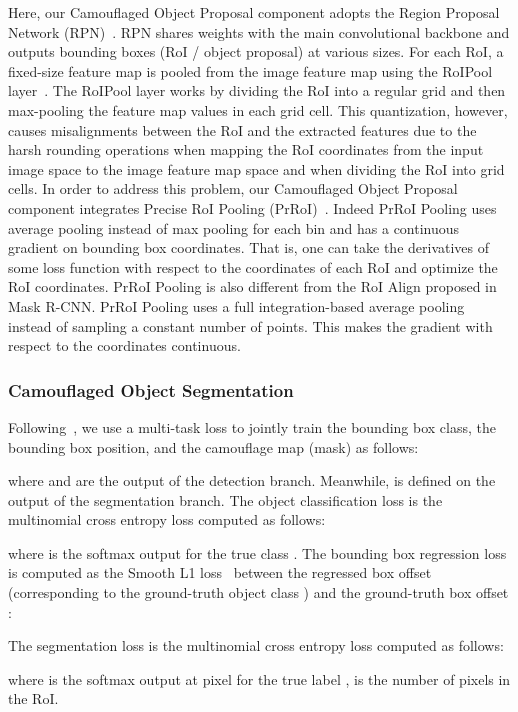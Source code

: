 \documentclass[journal]{IEEEtran}
\begin{document}
Here, our Camouflaged Object Proposal component adopts the Region Proposal Network (RPN)~\cite{Ren-NIPS2015}. RPN shares weights with the main convolutional backbone and outputs bounding boxes (RoI / object proposal) at various sizes. For each RoI, a fixed-size feature map is pooled from the image feature map using the RoIPool layer~\cite{Ren-NIPS2015}. The RoIPool layer works by dividing the RoI into a regular grid and then max-pooling the feature map values in each grid cell. This quantization, however, causes misalignments between the RoI and the extracted features due to the harsh rounding operations when mapping the RoI coordinates from the input image space to the image feature map space and when dividing the RoI into grid cells. In order to address this problem, our Camouflaged Object Proposal component integrates Precise RoI Pooling (PrRoI)~\cite{PrROI}. Indeed PrRoI Pooling uses average pooling instead of max pooling for each bin and has a continuous gradient on bounding box coordinates. That is, one can take the derivatives of some loss function with respect to the coordinates of each RoI and optimize the RoI coordinates. PrRoI Pooling is also different from the RoI Align proposed in Mask R-CNN. PrRoI Pooling uses a full integration-based average pooling instead of sampling a constant number of points. This makes the gradient with respect to the coordinates continuous.

\subsubsection{Camouflaged Object Segmentation}
Following~\cite{Ren-NIPS2015}, we use a multi-task loss  to jointly train the bounding box class, the bounding box position, and the camouflage map (mask) as follows:

where  and  are the output of the detection branch. Meanwhile, 
is defined on the output of the segmentation branch. The object classification loss  is the multinomial cross entropy loss computed as follows:

where  is the softmax output for the true class . The bounding box regression loss  is computed as the Smooth L1 loss~\cite{fast} between the regressed box offset  (corresponding to the ground-truth object class ) and the ground-truth box offset :



The segmentation loss  is the multinomial cross entropy loss computed as follows:


where  is the softmax output at pixel  for the true label ,  is the number of pixels in the RoI.
\end{document}
